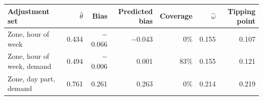 \begin{tabular}{lrrrrrr}
\toprule
Adjustment set & $\hat\theta$ & Bias & Predicted bias & Coverage & $\hat\omega$ & Tipping point \\
\midrule
Zone, hour of week & 0.434 & $-$0.066 & $-$0.043 & 0\% & 0.155 & 0.107 \\
Zone, hour of week, demand & 0.494 & $-$0.006 & 0.001 & 83\% & 0.155 & 0.121 \\
Zone, day part, demand & 0.761 & 0.261 & 0.263 & 0\% & 0.214 & 0.219 \\
\bottomrule
\end{tabular}
